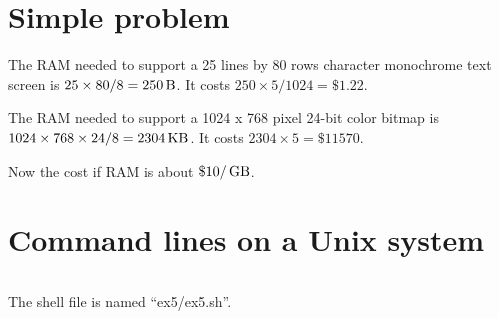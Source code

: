 \documentclass{article}
\newcommand{\unit}[1]{{\rm\,#1}}
\begin{document}
\section{Simple problem}
The RAM needed to support a 25 lines by 80 rows character monochrome text screen is $25\times80/8=250\unit{B}$. It costs  $250\times5/1024=\$ 1.22$.

The RAM needed to support a 1024 x 768 pixel 24-bit color bitmap is $1024\times768\times24/8=2304\unit{KB}$. It costs $2304\times5=\$ 11570$.

Now the cost if RAM is about $\$10/\unit{GB}$.

\section{Command lines on a Unix system}
\inputminted{shell}{ex5/ex5.sh}
The shell file is named ``ex5/ex5.sh''.
\end{document}
